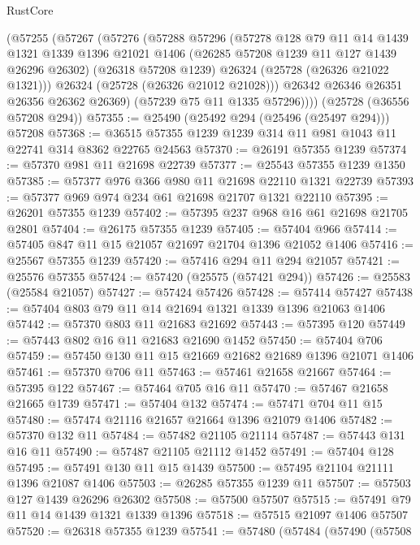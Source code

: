 \begin{lexlean}{RustCore}
\begin{coremodule}
      (@57255
        (@57267
          (@57276
            (@57288
              @57296
              (@57278
                @128
                @79
                @11
                @14
                @1439
                @1321
                @1339
                @1396
                @21021
                @1406
                (@26285 @57208 @1239 @11 @127 @1439 @26296 @26302)
                (@26318 @57208 @1239)
                @26324
                (@25728 (@26326 @21022 @1321)))
              @26324
              (@25728 (@26326 @21012 @21028)))
            @26342
            @26346
            @26351
            @26356
            @26362
            @26369)
          (@57239 @75 @11 @1335 @57296))))
    (@25728 (@36556 @57208 @294))
@57355 := @25490 (@25492 @294 (@25496 (@25497 @294))) @57208
@57368 := @36515 @57355 @1239 @1239 @314 @11 @981 @1043 @11 @22741 @314 @8362 @22765 @24563
@57370 := @26191 @57355 @1239
@57374 := @57370 @981 @11 @21698 @22739
@57377 := @25543 @57355 @1239 @1350
@57385 := @57377 @976 @366 @980 @11 @21698 @22110 @1321 @22739
@57393 := @57377 @969 @974 @234 @61 @21698 @21707 @1321 @22110
@57395 := @26201 @57355 @1239
@57402 := @57395 @237 @968 @16 @61 @21698 @21705 @2801
@57404 := @26175 @57355 @1239
@57405 := @57404 @966
@57414 := @57405 @847 @11 @15 @21057 @21697 @21704 @1396 @21052 @1406
@57416 := @25567 @57355 @1239
@57420 := @57416 @294 @11 @294 @21057
@57421 := @25576 @57355
@57424 := @57420 (@25575 (@57421 @294))
@57426 := @25583 (@25584 @21057)
@57427 := @57424 @57426
@57428 := @57414 @57427
@57438 := @57404 @803 @79 @11 @14 @21694 @1321 @1339 @1396 @21063 @1406
@57442 := @57370 @803 @11 @21683 @21692
@57443 := @57395 @120
@57449 := @57443 @802 @16 @11 @21683 @21690 @1452
@57450 := @57404 @706
@57459 := @57450 @130 @11 @15 @21669 @21682 @21689 @1396 @21071 @1406
@57461 := @57370 @706 @11
@57463 := @57461 @21658 @21667
@57464 := @57395 @122
@57467 := @57464 @705 @16 @11
@57470 := @57467 @21658 @21665 @1739
@57471 := @57404 @132
@57474 := @57471 @704 @11 @15
@57480 := @57474 @21116 @21657 @21664 @1396 @21079 @1406
@57482 := @57370 @132 @11
@57484 := @57482 @21105 @21114
@57487 := @57443 @131 @16 @11
@57490 := @57487 @21105 @21112 @1452
@57491 := @57404 @128
@57495 := @57491 @130 @11 @15 @1439
@57500 := @57495 @21104 @21111 @1396 @21087 @1406
@57503 := @26285 @57355 @1239 @11
@57507 := @57503 @127 @1439 @26296 @26302
@57508 := @57500 @57507
@57515 := @57491 @79 @11 @14 @1439 @1321 @1339 @1396
@57518 := @57515 @21097 @1406 @57507
@57520 := @26318 @57355 @1239
@57541 := @57480
    (@57484
      (@57490
        (@57508

\end{coremodule}
\end{lexlean}
